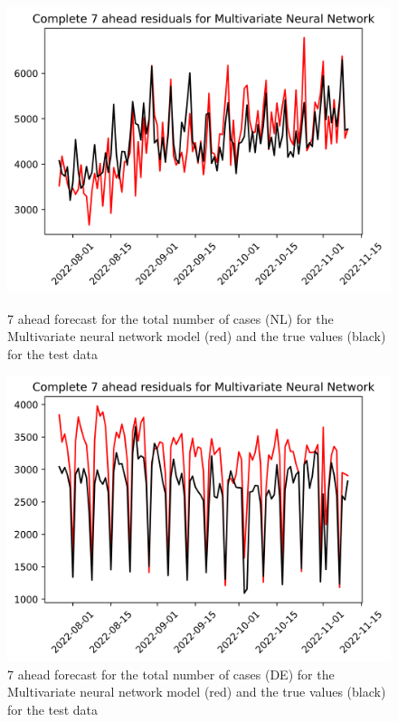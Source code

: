 \begin{figure}

\begin{minipage}{.45\textwidth}
  \centering
  \includegraphics[width=\linewidth]{pics/7_ah/Complete_7_ahead_Multivariate Neural Network.png}
  \caption{7 ahead forecast for the total number of cases (NL) for the Multivariate neural network model (red) and the true values (black) for the test data}
  \label{fig:tot_cases_fc_7_mvnn}
\end{minipage}
\begin{minipage}{.45\textwidth}
  \centering
  \includegraphics[width=\linewidth]{pics/7_ah/DE_Complete_7_ahead_Multivariate Neural Network.png}
  \caption{7 ahead forecast for the total number of cases (DE) for the Multivariate neural network model (red) and the true values (black) for the test data}
  \label{fig:tot_cases_fc_7_mvnn_DE}
\end{minipage}

\end{figure}
